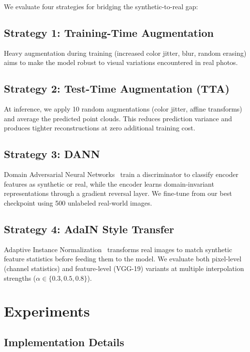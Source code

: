 \documentclass[10pt,twocolumn,letterpaper]{article}
\begin{document}
We evaluate four strategies for bridging the synthetic-to-real gap:

\subsection{Strategy 1: Training-Time Augmentation}

Heavy augmentation during training (increased color jitter, blur, random erasing) aims to make the model robust to visual variations encountered in real photos.

\subsection{Strategy 2: Test-Time Augmentation (TTA)}

At inference, we apply 10 random augmentations (color jitter, affine transforms) and average the predicted point clouds.
This reduces prediction variance and produces tighter reconstructions at zero additional training cost.

\subsection{Strategy 3: DANN}

Domain Adversarial Neural Networks~\cite{ganin2016domain} train a discriminator to classify encoder features as synthetic or real, while the encoder learns domain-invariant representations through a gradient reversal layer.
We fine-tune from our best checkpoint using 500 unlabeled real-world images.

\subsection{Strategy 4: AdaIN Style Transfer}

Adaptive Instance Normalization~\cite{huang2017arbitrary} transforms real images to match synthetic feature statistics before feeding them to the model.
We evaluate both pixel-level (channel statistics) and feature-level (VGG-19) variants at multiple interpolation strengths ($\alpha \in \{0.3, 0.5, 0.8\}$).

\section{Experiments}

\subsection{Implementation Details}
\end{document}
